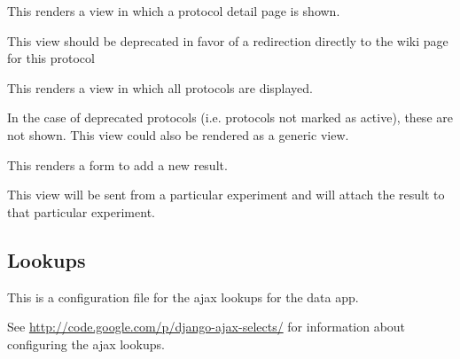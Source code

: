 \documentclass[letterpaper,10pt,english]{sphinxmanual}
\begin{document}

\begin{fulllineitems}
\label{api:experimentdb.data.views.protocol_detail}
This renders a view in which a protocol detail page is shown.

This view should be deprecated in favor of a redirection directly to the wiki page for this protocol

\end{fulllineitems}


\begin{fulllineitems}
\label{api:experimentdb.data.views.protocol_list}
This renders a view in which all protocols are displayed.

In the case of deprecated protocols (i.e. protocols not marked as active), these are not shown.  This view could also be rendered as a generic view.

\end{fulllineitems}


\begin{fulllineitems}
\label{api:experimentdb.data.views.result_new}
This renders a form to add a new result.

This view will be sent from a particular experiment and will attach the result to that particular experiment.

\end{fulllineitems}



\subsection{Lookups}
\label{api:lookups}\label{api:module-experimentdb.data.lookups}
This is a configuration file for the ajax lookups for the data app.

See \href{http://code.google.com/p/django-ajax-selects/}{http://code.google.com/p/django-ajax-selects/} for information about configuring the ajax lookups.
\end{document}
